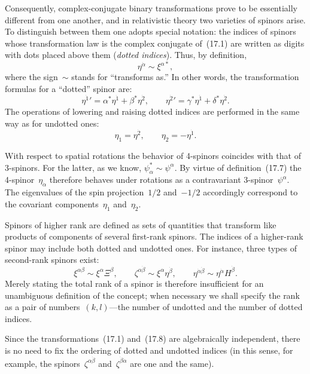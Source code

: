 Consequently, complex-conjugate binary transformations prove to be essentially different from one another, and in relativistic theory two varieties of spinors arise. To distinguish between them one adopts special notation: the indices of spinors whose transformation law is the complex conjugate of~(17.1) are written as digits with dots placed above them (\emph{dotted indices}). Thus, by definition,
\begin{equation}
\eta^{\dot\alpha} \sim \xi^{\alpha*},
\tag{17.7}
\end{equation}
where the sign~$\sim$ stands for ``transforms as.'' In other words, the transformation formulas for a ``dotted'' spinor are:
\begin{equation}
{\eta^{\dot 1}}' = \alpha^*\eta^{\dot 1} + \beta^*\eta^{\dot 2}, \qquad {\eta^{\dot 2}}' = \gamma^*\eta^{\dot 1} + \delta^*\eta^{\dot 2}.
\tag{17.8}
\end{equation}
The operations of lowering and raising dotted indices are performed in the same way as for undotted ones:
\begin{equation}
\eta_{\dot 1} = \eta^{\dot 2}, \qquad \eta_{\dot 2} = -\eta^{\dot 1}.
\tag{17.9}
\end{equation}

With respect to spatial rotations the behavior of 4-spinors coincides with that of 3-spinors. For the latter, as we know, $\psi^*_\alpha \sim \psi^\alpha$. By virtue of definition~(17.7) the 4-spinor~$\eta_{\dot\alpha}$ therefore behaves under rotations as a contravariant 3-spinor~$\psi^\alpha$. The eigenvalues of the spin projection~$1/2$ and~$-1/2$ accordingly correspond to the covariant components~$\eta_{\dot 1}$ and~$\eta_{\dot 2}$.

Spinors of higher rank are defined as sets of quantities that transform like products of components of several first-rank spinors. The indices of a higher-rank spinor may include both dotted and undotted ones. For instance, three types of second-rank spinors exist:
\[
\xi^{\alpha\beta} \sim \xi^\alpha\Xi^\beta, \qquad \zeta^{\alpha\dot\beta} \sim \xi^\alpha\eta^{\dot\beta}, \qquad \eta^{\dot\alpha\dot\beta} \sim \eta^{\dot\alpha}H^{\dot\beta}.
\]
Merely stating the total rank of a spinor is therefore insufficient for an unambiguous definition of the concept; when necessary we shall specify the rank as a pair of numbers~$(k, l)$---the number of undotted and the number of dotted indices.

Since the transformations~(17.1) and~(17.8) are algebraically independent, there is no need to fix the ordering of dotted and undotted indices (in this sense, for example, the spinors~$\zeta^{\alpha\dot\beta}$ and~$\zeta^{\dot\beta\alpha}$ are one and the same).

